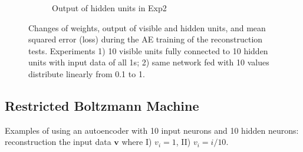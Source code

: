 \begin{figure}
\begin{subfigure}[t]{0.4\textwidth}
			\caption{Output of hidden units in Exp2}
		\end{subfigure}
		\caption{Changes of weights, output of visible and hidden units, and mean squared error (loss) during the AE training of the reconstruction tests. 
			Experiments 1) 10 visible units fully connected to 10 hidden units with input data of all 1s; 2) same network fed with 10 values distribute linearly from 0.1 to 1.}
	\end{figure}



\subsection{Restricted Boltzmann Machine}

Examples of using an autoencoder with 10 input neurons and 10 hidden neurons: reconstruction the input data $\mathbf{v}$ where I) $v_i = 1$, II) $v_i = i/10$.
